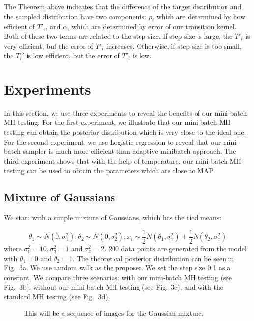 \documentclass{article}
\begin{document}
The Theorem above indicates that the difference of the target distribution and the sampled distribution have two components: $\rho_i$ which are determined by how efficient of $T'_i$, and $\alpha_i$ which are determined by error of our transition kernel. Both of these two terms are related to the step size. If step size is large, the $T'_i$ is very efficient, but the error of $T'_i$ increases. Otherwise, if step size is too small, the $T_i'$ is low efficient, but the error of $T'_i$ is low.





\section{Experiments}\label{sec:experiments}

In this section, we use three experiments to reveal the benefits of our mini-batch MH testing. For the first experiment, we illustrate that our mini-batch MH testing can obtain the posterior distribution which is very close to the ideal one. For the second experiment, we use Logistic regression to reveal that our mini-batch sampler is much more efficient than adaptive minibatch approach. The third experiment shows that with the help of temperature, our mini-batch MH testing can be used to obtain the parameters which are close to MAP. 
\subsection{Mixture of Gaussians}\label{ssec:gaussians}

We start with a simple mixture of Gaussians, which has the tied means:

\[
\theta_1 \sim N(0, \sigma_1^2); \theta_2 \sim N(0, \sigma_2^2); x_i \sim \frac{1}{2}N(\theta_1, \sigma_x^2) + \frac{1}{2} N(\theta_2, \sigma_x^2)
\]
where $\sigma_1^2 = 10, \sigma_2^2 = 1$ and $\sigma_x^2=2$. 200 data points are generated from the model with $\theta_1 = 0$ and $\theta_2 = 1$. The theoretical posterior distribution can be seen in Fig.~3a. We use random walk as the proposer. We set the step size 0.1 as a constant. We compare three scenarios: with our mini-batch MH testing (see Fig.~3b), without our mini-batch MH testing (see Fig.~3c), and with the standard MH testing (see Fig.~3d). 

\begin{figure}[ht]
  \centering
  \fbox{\rule[-.5cm]{0cm}{4cm} \rule[-.5cm]{4cm}{0cm}}
  \caption{This will be a sequence of images for the Gaussian mixture.}
\end{figure}
\end{document}
